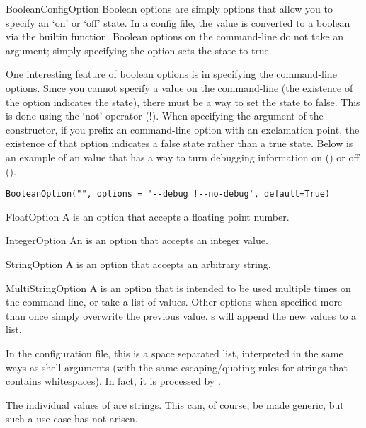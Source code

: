 \begin{classdesc}{BooleanConfigOption}{}
Boolean options are simply options that allow you to specify an `on' or 
`off' state. In a config file, the value is converted to a boolean via the
builtin  function. Boolean options on the command-line do not take
an argument; simply specifying the option sets the state to true.

One interesting feature of boolean options is in specifying the command-line
options.  Since you cannot specify a value on the command-line (the existence
of the option indicates the state), there must be a way to set the state to
false.  This is done using the `not' operator (!).  When specifying the 
 argument of the constructor, if you prefix an command-line 
option with an exclamation point, the existence of that option indicates
a false state rather than a true state.  Below is an example of an 
value that has a way to turn debugging information on () 
or off ().
\begin{verbatim}
BooleanOption("", options = '--debug !--no-debug', default=True)
\end{verbatim}
\end{classdesc}

\begin{classdesc}{FloatOption}{}
A  is an option that accepts a floating point number.
\end{classdesc}

\begin{classdesc}{IntegerOption}{}
An  is an option that accepts an integer value.
\end{classdesc}

\begin{classdesc}{StringOption}{}
A  is an option that accepts an arbitrary string.
\end{classdesc}

\begin{classdesc}{MultiStringOption}{}
A  is an option that is intended to be used multiple
times on the command-line, or take a list of values. Other options when
specified more than once simply overwrite the previous value.
s will append the new values to a list.

In the configuration file, this is a space separated list, interpreted in the
same ways as shell arguments (with the same escaping/quoting rules for strings
that contains whitespaces). In fact, it is processed by .

The individual values of  are strings. This can, of
course, be made generic, but such a use case has not arisen.
\end{classdesc}

